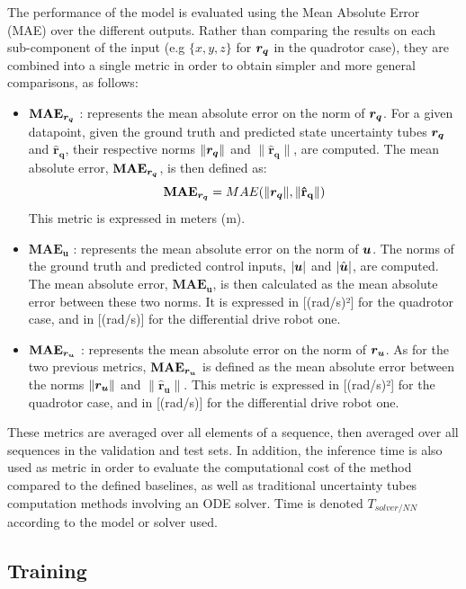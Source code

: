 The performance of the model is evaluated using the Mean Absolute Error (MAE) over the different outputs. 
Rather than comparing the results on each sub-component of the input (e.g $\{x, y, z\}$ for $\boldsymbol{r_q}$ in the quadrotor case), they are combined into a single metric in order to obtain simpler and more general comparisons, as follows:
\begin{itemize}
    \item $\mathbf{MAE_{\boldsymbol{r_q}}}$ : represents the mean absolute error on the norm of $\boldsymbol{r_q}$. 
    For a given datapoint, given the ground truth and predicted state uncertainty tubes $\boldsymbol{r_q}$ and $\mathbf{\hat{r}_q}$, their respective norms $\|\boldsymbol{r_q}\|$ and $\|\mathbf{\hat{r}_q}\|$, are computed. 
    The mean absolute error, $\mathbf{MAE_{\boldsymbol{r_q}}}$, is then defined as:
    \begin{equation}\label{eq:MAE rq}
        \mathbf{MAE_{\boldsymbol{r_q}}} = MAE(\|\boldsymbol{r_q}\|, \|\mathbf{\hat{r}_q}\|)
    \end{equation}
    This metric is expressed in meters (m).
    \item $\mathbf{MAE_{u}}$ : represents the mean absolute error on the norm of $\boldsymbol{u}$. 
    The norms of the ground truth and predicted control inputs, $|\boldsymbol{u}|$ and $|\hat{\boldsymbol{u}}|$, are computed. 
    The mean absolute error, $\mathbf{MAE_{u}}$, is then calculated as the mean absolute error between these two norms. 
    It is expressed in [(rad/s)²] for the quadrotor case, and in [(rad/s)] for the differential drive robot one.
    \item $\mathbf{MAE_{\boldsymbol{r_u}}}$ : represents the mean absolute error on the norm of $\boldsymbol{r_u}$. 
    As for the two previous metrics, $\mathbf{MAE_{\boldsymbol{r_u}}}$ is defined as the mean absolute error between the norms $\|\boldsymbol{r_u}\|$ and $\|\mathbf{\hat{r}_u}\|$. 
    This metric is expressed in [(rad/s)²] for the quadrotor case, and in [(rad/s)] for the differential drive robot one.
\end{itemize}

These metrics are averaged over all elements of a sequence, then averaged over all sequences in the validation and test sets. 
In addition, the inference time is also used as metric in order to evaluate the computational cost of the method compared to the defined baselines, as well as traditional uncertainty tubes computation methods involving an ODE solver. 
Time is denoted $T_{solver/NN}$ according to the model or solver used.

\subsection{Training}

